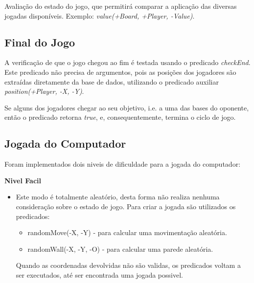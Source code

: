 \documentclass[a4paper]{article}
\begin{document}
Avaliação do estado do jogo, que permitirá comparar a aplicação das diversas jogadas disponíveis. Exemplo: \textit{value(+Board, +Player, -Value)}.

\subsection{Final do Jogo} A verificação de que o jogo chegou ao fim é testada usando o predicado \mbox{\textit{checkEnd}}. Este predicado não precisa de argumentos, pois as posições dos jogadores são extraídas diretamente da base de dados, utilizando o predicado auxiliar \textit{position(+Player, -X, -Y)}. \par
Se alguns dos jogadores chegar ao seu objetivo, i.e. a uma das bases do oponente, então o predicado retorna \textit{true}, e, consequentemente, termina o ciclo de jogo.



\subsection{Jogada do Computador} 

Foram implementados dois niveis de dificuldade para a jogada do computador:

\textbf{Nivel Facil}
\begin{itemize}
\item Este modo é totalmente aleatório, desta forma não realiza nenhuma consideração sobre o estado de jogo. Para criar a jogada são utilizados os predicados:
	\begin{itemize}
		\item randomMove(-X, -Y) - para calcular uma movimentação aleatória.
		\item randomWall(-X, -Y, -O) - para calcular uma parede aleatória.
	\end{itemize}
	 Quando as coordenadas devolvidas não são validas, os predicados voltam a ser executados, até ser encontrada uma jogada possivel.
\end{itemize}
\end{document}
